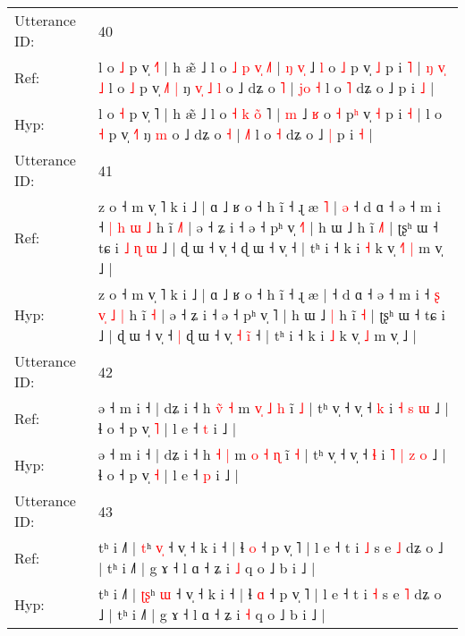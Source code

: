 \documentclass[10pt]{article}
\DeclareRobustCommand{\hl}[1]{{\textcolor{red}{#1}}}
\begin{document}
\begin{longtable}{ll}
\midrule
Utterance ID: & 40 \\
Ref: & l o \hl{˩} p v̩ \hl{˧}˥ | h æ̃ ˩ l o \hl{˩} \hl{p} \hl{v}\hl{̩} \hl{˩}˥ |\hl{ }\hl{ŋ} \hl{v}\hl{̩} ˩ \hl{l} o \hl{˩} p\hl{} v̩ \hl{˩} p i \hl{˥} |\hl{ }\hl{ŋ}\hl{ }\hl{v}\hl{̩}\hl{ }\hl{˩} l o \hl{˩} p v̩ \hl{˩}˥\hl{ }\hl{|} ŋ\hl{ }\hl{v}\hl{̩}\hl{ }\hl{˩} \hl{l} o ˩ dʑ o \hl{˥} | \hl{j}\hl{o}\hl{ }\hl{˧} l o \hl{˥} dʑ o ˩\hl{}\hl{} p i \hl{˩} |
 \\
Hyp: & l o \hl{˧} p v̩ \hl{}˥ | h æ̃ ˩ l o \hl{˧} \hl{k} \hl{o}\hl{̃} \hl{}˥ |\hl{}\hl{} \hl{}\hl{m} ˩ \hl{ʁ} o \hl{˧} p\hl{ʰ} v̩ \hl{˧} p i \hl{˧} |\hl{}\hl{}\hl{}\hl{}\hl{}\hl{}\hl{} l o \hl{˧} p v̩ \hl{˧}˥\hl{}\hl{} ŋ\hl{}\hl{}\hl{}\hl{}\hl{} \hl{m} o ˩ dʑ o \hl{˧} | \hl{}\hl{}\hl{˩}\hl{˥} l o \hl{˧} dʑ o ˩\hl{ }\hl{|} p i \hl{˧} |
 \\
\midrule
Utterance ID: & 41 \\
Ref: & z o ˧ m v̩ ˥ k i ˩ | ɑ ˩ ʁ o ˧ h ĩ ˧ ɻ æ\hl{ }\hl{˥} |\hl{ }\hl{ə} ˧ d ɑ ˧ ə ˧ m i ˧ \hl{|} \hl{}\hl{h} \hl{ɯ} \hl{˩} h ĩ \hl{˩}\hl{˥} | ə ˧ ʑ i ˧ ə ˧ pʰ v̩ \hl{˧}˥ | h ɯ ˩\hl{}\hl{} h ĩ \hl{˩}\hl{˥} | ʈʂʰ ɯ ˧ tɕ i\hl{ }\hl{˩}\hl{ }\hl{ɳ}\hl{ }\hl{ɯ} ˩ | ɖ ɯ ˧ v̩ ˧\hl{}\hl{} ɖ ɯ ˧ v̩\hl{}\hl{}\hl{}\hl{}\hl{} ˧ | tʰ i ˧ k i \hl{˧} k v̩\hl{ }\hl{˧}\hl{˥} \hl{|} m v̩ ˩ |
 \\
Hyp: & z o ˧ m v̩ ˥ k i ˩ | ɑ ˩ ʁ o ˧ h ĩ ˧ ɻ æ\hl{}\hl{} |\hl{}\hl{} ˧ d ɑ ˧ ə ˧ m i ˧ \hl{ʂ} \hl{v}\hl{̩} \hl{˩} \hl{|} h ĩ \hl{}\hl{˧} | ə ˧ ʑ i ˧ ə ˧ pʰ v̩ \hl{}˥ | h ɯ ˩\hl{ }\hl{|} h ĩ \hl{}\hl{˧} | ʈʂʰ ɯ ˧ tɕ i\hl{}\hl{}\hl{}\hl{}\hl{}\hl{} ˩ | ɖ ɯ ˧ v̩ ˧\hl{ }\hl{|} ɖ ɯ ˧ v̩\hl{ }\hl{˧}\hl{ }\hl{i}\hl{̃} ˧ | tʰ i ˧ k i \hl{˩} k v̩\hl{}\hl{}\hl{} \hl{˩} m v̩ ˩ |
 \\
\midrule
Utterance ID: & 42 \\
Ref: & ə ˧ m i ˧ | dʑ i ˧ h \hl{v}\hl{̃} \hl{˧} m \hl{v}\hl{̩} \hl{˩} \hl{h} ĩ \hl{˩} | tʰ v̩ ˧ v̩ ˧ \hl{k} i\hl{}\hl{} \hl{˧} \hl{s} \hl{ɯ} ˩ | ɬ o ˧ p v̩ \hl{˥} | l e ˧ \hl{t} i ˩ |
 \\
Hyp: & ə ˧ m i ˧ | dʑ i ˧ h \hl{}\hl{˧} \hl{|} m \hl{}\hl{o} \hl{˧} \hl{ɳ} ĩ \hl{˧} | tʰ v̩ ˧ v̩ ˧ \hl{ɬ} i\hl{ }\hl{˥} \hl{|} \hl{z} \hl{o} ˩ | ɬ o ˧ p v̩ \hl{˧} | l e ˧ \hl{p} i ˩ |
 \\
\midrule
Utterance ID: & 43 \\
Ref: & tʰ i ˩˥ | \hl{}\hl{t}ʰ \hl{v}\hl{̩} ˧ v̩ ˧ k i ˧ | ɬ \hl{o} ˧ p v̩ ˥ | l e ˧ t i \hl{˩} s e \hl{˩} dʑ o ˩ | tʰ i ˩˥ | g ɤ ˧ l ɑ ˧ ʑ i \hl{˩} q o ˩ b i ˩ |
 \\
Hyp: & tʰ i ˩˥ | \hl{ʈ}\hl{ʂ}ʰ \hl{}\hl{ɯ} ˧ v̩ ˧ k i ˧ | ɬ \hl{ɑ} ˧ p v̩ ˥ | l e ˧ t i \hl{˧} s e \hl{˥} dʑ o ˩ | tʰ i ˩˥ | g ɤ ˧ l ɑ ˧ ʑ i \hl{˧} q o ˩ b i ˩ |

\end{longtable}
\end{document}
